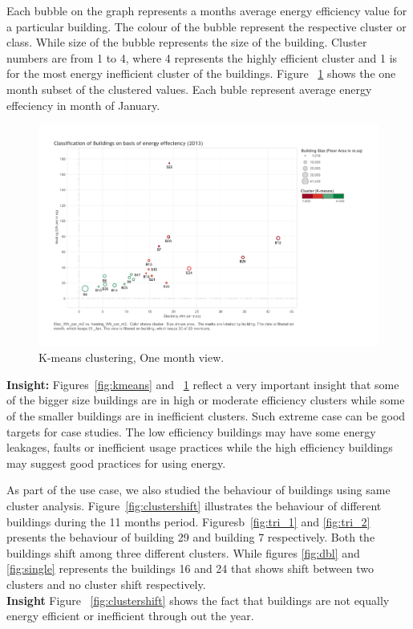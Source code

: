Each bubble on the graph represents a months average energy efficiency value for a particular building. The colour of the bubble represent the respective cluster or class. While size of the bubble represents the size of the building. Cluster numbers are from 1 to 4, where 4 represents the highly efficient cluster and 1 is for the most energy inefficient cluster of the buildings. Figure ~\ref{fig:kmeans_jan} shows the one month subset of the clustered values. Each buble represent average energy effeciency in month of January. 
\begin{figure}[!ht]
    \begin{center}
      \includegraphics[width=\textwidth]{images/kmeans_jan.pdf}
      \caption{K-means clustering, One month view.}
      \label{fig:kmeans_jan}
    \end{center}
\end{figure} 

\textbf{Insight:} Figures~\ref{fig:kmeans} and ~\ref{fig:kmeans_jan} reflect a very important insight that some of the bigger size buildings are in high or moderate efficiency clusters while some of the smaller buildings are in inefficient clusters. Such extreme case can be good targets for case studies. The low efficiency buildings may have some energy leakages, faults or inefficient usage practices while the high efficiency buildings may suggest good practices for using energy. 

As part of the use case, we also studied the behaviour of buildings using same cluster analysis. Figure~\ref{fig:clustershift} illustrates the behaviour of different buildings during the 11 months period. Figuresb~\ref{fig:tri_1} and \ref{fig:tri_2} presents the behaviour of building 29 and building 7 respectively. Both the buildings shift among three different clusters. While figures \ref{fig:dbl} and \ref{fig:single} represents the buildings 16 and 24 that shows shift between two clusters and no cluster shift respectively.
\\
\textbf{Insight} Figure ~\ref{fig:clustershift} shows the fact that buildings are not equally energy efficient or inefficient through out the year. 

